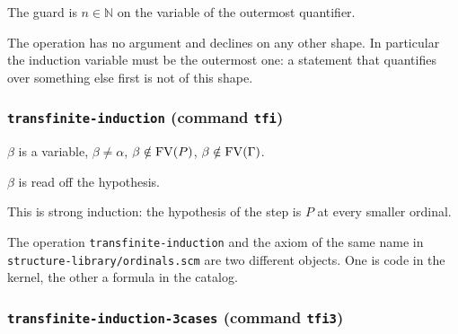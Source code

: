 \label{kop:nn-induction}%
\begin{VNBcond}
\item[Shape] The guard is $n \in \mathbb{N}$ on the variable of the
  outermost quantifier.
\end{VNBcond}
The operation has no argument and declines on any other shape.  In
particular the induction variable must be the outermost one: a statement
that quantifies over something else first is not of this shape.

\subsubsection*{\texttt{transfinite-induction} (command \texttt{tfi})}

\label{kop:transfinite-induction}%
\begin{VNBcond}
\item[Freshness] $\beta$ is a variable, $\beta \neq \alpha$,
  $\beta \notin \mathrm{FV}(P)$, $\beta \notin \mathrm{FV}(\Gamma)$.
\item[Matching] $\beta$ is read off the hypothesis.
\end{VNBcond}
This is strong induction: the hypothesis of the step is $P$ at every
smaller ordinal.

\begin{remark}
The operation \texttt{transfinite-induction} and the axiom of the same
name in \texttt{structure-library/ordinals.scm} are two different
objects.  One is code in the kernel, the other a formula in the catalog.
\end{remark}

\subsubsection*{\texttt{transfinite-induction-3cases} (command \texttt{tfi3})}

